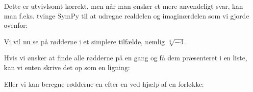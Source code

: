 \documentclass[letterpaper,10pt,english]{jupyterBook}
\begin{document}
\noindent{}

\begin{sphinxVerbatim}[commandchars=\\\{\}]
  
\end{sphinxVerbatim}

\noindent{}

Dette er utvivlsomt korrekt, men når man ønsker et mere anvendeligt svar, kan man f.eks. tvinge SymPy til at udregne real\sphinxhyphen{}delen og imaginærdelen som vi gjorde ovenfor:

\begin{sphinxVerbatim}[commandchars=\\\{\}]
    
\end{sphinxVerbatim}

\noindent{}

\noindent{}

Vi vil nu se på rødderne i et simplere tilfælde, nemlig \(\sqrt[4]{-4}\).

Hvis vi ønsker at finde alle rødderne på en gang og få dem præsenteret i en liste, kan vi enten skrive det op som en ligning:

\begin{sphinxVerbatim}[commandchars=\\\{\}]
   
  
\end{sphinxVerbatim}

\noindent{}

Eller vi kan beregne rødderne en efter en ved hjælp af en for\sphinxhyphen{}løkke:

\begin{sphinxVerbatim}[commandchars=\\\{\}]
   
        
        
\end{sphinxVerbatim}
\end{document}
